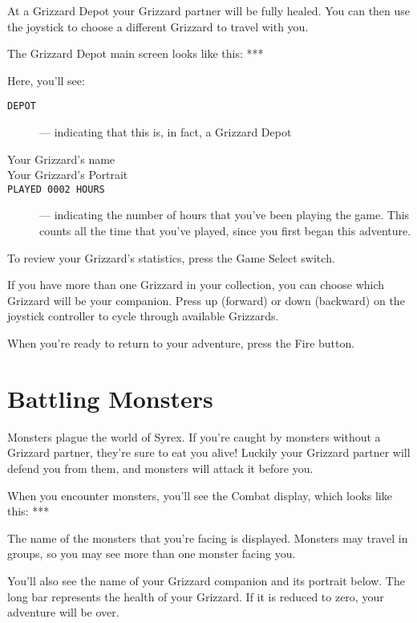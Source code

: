 \documentclass[12pt,openright,book]{memoir}
\begin{document}
At  a  Grizzard  Depot  your  Grizzard partner  will  be  fully  healed.
\ifdefined\DEMO\else You  can then  use the joystick  to choose  a different
Grizzard to travel with you. \fi

The Grizzard Depot main screen looks like this: ***

Here, you'll see:

\begin{description}
  
\item[\texttt{DEPOT}] --- indicating that this is, in fact, a Grizzard Depot
\item[Your Grizzard's name] 
\item[Your Grizzard's Portrait] 
\item[\texttt{PLAYED 0002 HOURS}] --- indicating  the number of hours that you've
  been playing  the game. This counts  all the time that  you've played,
  since you  first began this  adventure.

\end{description}

To review your Grizzard's statistics, press the Game Select switch.

\ifdefined\DEMO\else
If you  have more than one  Grizzard in your collection,  you can choose
which  Grizzard will  be  your  companion. Press  up  (forward) or  down
(backward)  on  the  joystick  controller  to  cycle  through  available
Grizzards.
\fi

When you're ready to return to your adventure, press the Fire button.


\section{Battling Monsters}

Monsters plague the world of Syrex. If you're caught by monsters without
a Grizzard partner, they're sure to eat you alive! Luckily your Grizzard
partner  will  defend  you  from  them,  and  monsters  will  attack  it
before you.

When you encounter monsters, you'll  see the Combat display, which looks
like this: ***

The name of  the monsters that you're facing is  displayed. Monsters may
travel in groups, so you may see more than one monster facing you.

You'll also  see the name  of your  Grizzard companion and  its portrait
below. The  long bar represents  the health of  your Grizzard. If  it is
reduced to zero, your adventure will be over.
\end{document}
